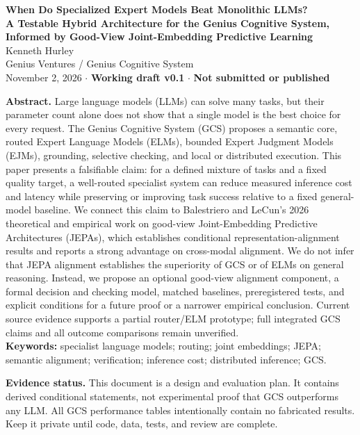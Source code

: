 \documentclass[10pt,letterpaper]{article}
\begin{document}
\begin{center}
{\large\bfseries\color{navy} When Do Specialized Expert Models Beat Monolithic LLMs?}\\[5pt]
{\normalsize\bfseries A Testable Hybrid Architecture for the Genius Cognitive System, Informed by Good-View Joint-Embedding Predictive Learning}\\[10pt]
{\small Kenneth Hurley}\\[2pt]
{\small Genius Ventures / Genius Cognitive System}\\[4pt]
{\footnotesize November 2, 2026 \quad $\cdot$ \quad \textbf{Working draft v0.1} \quad $\cdot$ \quad \textbf{Not submitted or published}}\\[9pt]
\begin{minipage}{0.94\textwidth}
\small
\noindent\textbf{Abstract.} Large language models (LLMs) can solve many tasks, but their parameter count alone does not show that a single model is the best choice for every request. The Genius Cognitive System (GCS) proposes a semantic core, routed Expert Language Models (ELMs), bounded Expert Judgment Models (EJMs), grounding, selective checking, and local or distributed execution. This paper presents a falsifiable claim: for a defined mixture of tasks and a fixed quality target, a well-routed specialist system can reduce measured inference cost and latency while preserving or improving task success relative to a fixed general-model baseline. We connect this claim to Balestriero and LeCun's 2026 theoretical and empirical work on good-view Joint-Embedding Predictive Architectures (JEPAs), which establishes conditional representation-alignment results and reports a strong advantage on cross-modal alignment. We do not infer that JEPA alignment establishes the superiority of GCS or of ELMs on general reasoning. Instead, we propose an optional good-view alignment component, a formal decision and checking model, matched baselines, preregistered tests, and explicit conditions for a future proof or a narrower empirical conclusion. Current source evidence supports a partial router/ELM prototype; full integrated GCS claims and all outcome comparisons remain unverified.
\\[4pt]
\noindent\textbf{Keywords:} specialist language models; routing; joint embeddings; JEPA; semantic alignment; verification; inference cost; distributed inference; GCS.
\end{minipage}
\end{center}
\vspace{7pt}
\noindent\colorbox{pale}{\parbox{\dimexpr\textwidth-2\fboxsep\relax}{\footnotesize\textbf{Evidence status.} This document is a design and evaluation plan. It contains derived conditional statements, not experimental proof that GCS outperforms any LLM. All GCS performance tables intentionally contain no fabricated results. Keep it private until code, data, tests, and review are complete.}}
\end{document}

